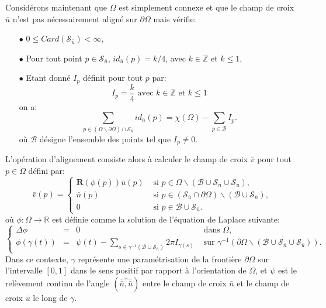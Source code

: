 Considérons maintenant que $\Omega$ est simplement connexe et que le champ de croix $\bar{u}$ n'est pas nécessairement aligné sur $\partial\Omega$ mais vérifie:
\begin{itemize}
 \item[$\bullet$] $0\leq Card(\mathcal{S}_{\bar{u}})<\infty$,\\
 \item[$\bullet$] Pour tout point $p\in\mathcal{S}_{\bar{u}}$, $id_{\bar{u}}(p)=k/4$, avec $k\in\mathbb{Z}$ et $k\leq 1$,\\
 \item[$\bullet$] Etant donné $I_p$ définit pour tout $p$ par:
\begin{equation}
I_p=\displaystyle\frac{k}{4}\mbox{ avec }k\in\mathbb{Z}\mbox{ et }k\leq 1
\end{equation}
on a:
 \begin{equation}
    \label{eqn:principe_hypothese_u_space}
    \sum_{p\in(\Omega\backslash\partial\Omega)\cap\mathcal{S}_{\bar{u}}}id_{\bar{u}}(p)=\chi(\Omega)-\sum_{p\in\mathcal{B}}I_p.
\end{equation}
où $\mathcal{B}$ désigne l'ensemble des points tel que $I_p\neq 0$.\\
\end{itemize}
L'opération d'alignement consiste alors à calculer le champ de croix $\bar{v}$ pour tout $p\in\Omega$ défini par:
\begin{equation}
\bar{v}(p)=
\left\{
\begin{array}{ll}
\mathbf{R}(\phi(p))\bar{u}(p) & \mbox{ si } p\in\Omega\backslash(\mathcal{B}\cup\mathcal{S}_{\bar{n}}\cup\mathcal{S}_{\bar{u}}),\\[0.5cm]
\bar{n}(p) & \mbox{ si } p\in(\mathcal{S}_{\bar{u}}\cap\partial\Omega)\backslash(\mathcal{B}\cup\mathcal{S}_{\bar{n}}),\\[0.5cm]
0 & \mbox{ si } p\in\mathcal{B}\cup\mathcal{S}_{\bar{n}}.
\end{array}
\right.
\label{eqn:principe_def_v_space}
\end{equation}
où $\phi:\Omega\longrightarrow\mathbb{R}$ est définie comme la solution de l'équation de Laplace suivante:
\begin{equation}
\left\{
\begin{array}{lcll}
\Delta\phi &=& 0 &\mbox{ dans }\Omega,\\[0.5cm]
\phi(\gamma(t))&=&\psi(t)-\displaystyle\sum_{s\in\gamma^{-1}(\mathcal{B}\cup\mathcal{S}_{\bar{n}})}2\pi I_{\gamma(s)}& \mbox{ sur } \gamma^{-1}(\partial\Omega\backslash(\mathcal{B}\cup\mathcal{S}_{\bar{n}}\cup\mathcal{S}_{\bar{u}})).
\end{array}
\right.
\label{eqn:principe_def_phi_space}
\end{equation}
Dans ce contexte, $\gamma$ représente une paramétrisation de la frontière $\partial\Omega$ sur l'intervalle $[0, 1]$ dans le sens positif par rapport à l'orientation de $\Omega$, et $\psi$ est le relèvement continu de l'angle $(\widehat{\bar{n}, \bar{u}})$ entre le champ de croix $\bar{n}$ et le champ de croix $\bar{u}$ le long de $\gamma$.

